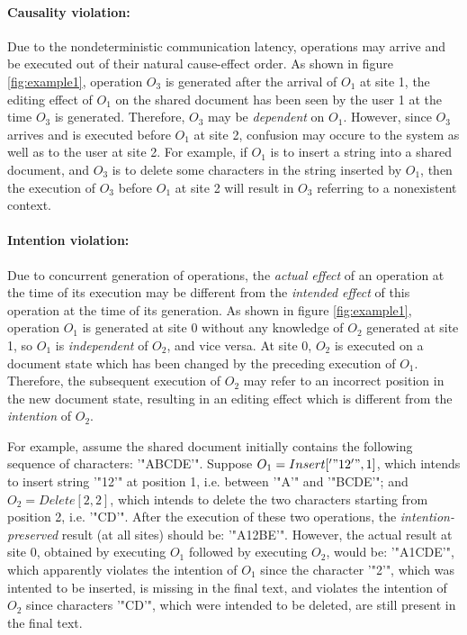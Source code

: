\documentclass[11pt,a4paper]{article}
\begin{document}
\paragraph{Causality violation:}
Due to the nondeterministic communication latency, operations may arrive and be executed out of their natural cause-effect order. As shown in figure \ref{fig:example1}, operation $O_{3}$ is generated after the arrival of $O_{1}$ at site 1, the editing effect of $O_{1}$ on the shared document has been seen by the user 1 at the time $O_{3}$ is generated. Therefore, $O_{3}$ may be \emph{dependent} on $O_{1}$. However, since $O_{3}$ arrives and is executed before $O_{1}$ at site 2, confusion may occure to the system as well as to the user at site 2. For example, if $O_{1}$ is to insert a string into a shared document, and $O_{3}$ is to delete some characters in the string inserted by $O_{1}$, then the execution of $O_{3}$ before $O_{1}$ at site 2 will result in $O_{3}$ referring to a nonexistent context. 

\paragraph{Intention violation:}
Due to concurrent generation of operations, the \emph{actual effect} of an operation at the time of its execution may be different from the \emph{intended effect} of this operation at the time of its generation. As shown in figure \ref{fig:example1}, operation $O_{1}$ is generated at site 0 without any knowledge of $O_{2}$ generated at site 1, so $O_{1}$ is \emph{independent} of $O_{2}$, and vice versa. At site 0, $O_{2}$ is executed on a document state which has been changed by the preceding execution of $O_{1}$. Therefore, the subsequent execution of $O_{2}$ may refer to an incorrect position in the new document state, resulting in an editing effect which is different from the \emph{intention} of $O_{2}$. 

For example, assume the shared document initially contains the following sequence of characters: '"ABCDE'". Suppose $O_{1}=Insert['"12'",1]$, which intends to insert string '"12'" at position 1, i.e. between '"A'" and '"BCDE'"; and $O_{2}=Delete[2,2]$, which intends to delete the two characters starting from position 2, i.e. '"CD'". After the execution of these two operations, the \emph{intention-preserved} result (at all sites) should be: '"A12BE'". However, the actual result at site 0, obtained by executing $O_{1}$ followed by executing $O_{2}$, would be: '"A1CDE'", which apparently violates the intention of $O_{1}$ since the character '"2'", which was intented to be inserted, is missing in the final text, and violates the intention of $O_{2}$ since characters '"CD'", which were intended to be deleted, are still present in the final text.
\end{document}
